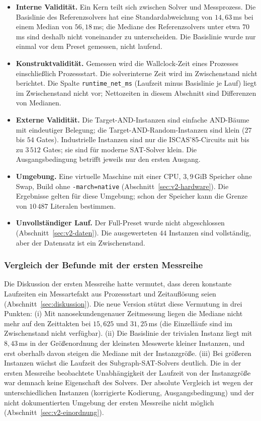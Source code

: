 \documentclass[a4paper,12pt]{article}
\theoremstyle{definition}
\begin{document}
\begin{itemize}
	\item \textbf{Interne Validität.} Ein Kern teilt sich zwischen Solver und Messprozess. Die Basislinie des Referenzsolvers hat eine Standardabweichung von $14{,}63$\,ms bei einem Median von $56{,}18$\,ms; die Mediane des Referenzsolvers unter etwa $70$\,ms sind deshalb nicht voneinander zu unterscheiden. Die Basislinie wurde nur einmal vor dem Preset gemessen, nicht laufend.
	\item \textbf{Konstruktvalidität.} Gemessen wird die Wallclock-Zeit eines Prozesses einschließlich Prozessstart. Die solverinterne Zeit wird im Zwischenstand nicht berichtet. Die Spalte \texttt{runtime\_net\_ms} (Laufzeit minus Basislinie je Lauf) liegt im Zwischenstand nicht vor; Nettozeiten in diesem Abschnitt sind Differenzen von Medianen.
	\item \textbf{Externe Validität.} Die Target-AND-Instanzen sind einfache AND-Bäume mit eindeutiger Belegung; die Target-AND-Random-Instanzen sind klein ($27$ bis $54$ Gates). Industrielle Instanzen sind nur die ISCAS'85-Circuits mit bis zu $3\,512$ Gates; sie sind für moderne SAT-Solver klein. Die Ausgangsbedingung betrifft jeweils nur den ersten Ausgang.
	\item \textbf{Umgebung.} Eine virtuelle Maschine mit einer CPU, $3{,}9$\,GiB Speicher ohne Swap, Build ohne \texttt{-march=native} (Abschnitt~\ref{sec:v2-hardware}). Die Ergebnisse gelten für diese Umgebung; schon der Speicher kann die Grenze von $10\,487$ Literalen bestimmen.
	\item \textbf{Unvollständiger Lauf.} Der Full-Preset wurde nicht abgeschlossen (Abschnitt~\ref{sec:v2-daten}). Die ausgewerteten $44$ Instanzen sind vollständig, aber der Datensatz ist ein Zwischenstand.
\end{itemize}

\subsubsection{Vergleich der Befunde mit der ersten Messreihe}
\label{sec:v2-vergleich-erste}

Die Diskussion der ersten Messreihe hatte vermutet, dass deren konstante Laufzeiten ein Messartefakt aus Prozessstart und Zeitauflösung seien (Abschnitt~\ref{sec:diskussion}). Die neue Version stützt diese Vermutung in drei Punkten: (i) Mit nanosekundengenauer Zeitmessung liegen die Mediane nicht mehr auf den Zeittakten bei $15{,}625$ und $31{,}25$\,ms (die Einzelläufe sind im Zwischenstand nicht verfügbar). (ii) Die Basislinie der trivialen Instanz liegt mit $8{,}43$\,ms in der Größenordnung der kleinsten Messwerte kleiner Instanzen, und erst oberhalb davon steigen die Mediane mit der Instanzgröße. (iii) Bei größeren Instanzen wächst die Laufzeit des Subgraph-SAT-Solvers deutlich. Die in der ersten Messreihe beobachtete Unabhängigkeit der Laufzeit von der Instanzgröße war demnach keine Eigenschaft des Solvers. Der absolute Vergleich ist wegen der unterschiedlichen Instanzen (korrigierte Kodierung, Ausgangsbedingung) und der nicht dokumentierten Umgebung der ersten Messreihe nicht möglich (Abschnitt~\ref{sec:v2-einordnung}).
\end{document}
